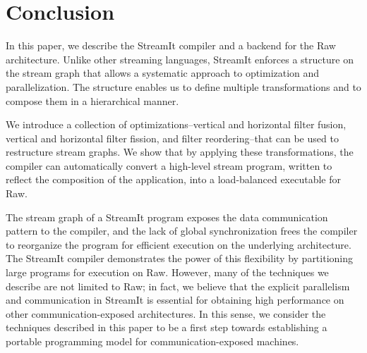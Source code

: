 \section{Conclusion}
\label{sec:conclusion}

In this paper, we describe the StreamIt compiler and a backend for the
Raw architecture.  Unlike other streaming languages, StreamIt enforces
a structure on the stream graph that allows a systematic approach to
optimization and parallelization.  The structure enables us to define
multiple transformations and to compose them in a hierarchical manner.

We introduce a collection of optimizations--vertical and horizontal
filter fusion, vertical and horizontal filter fission, and filter
reordering--that can be used to restructure stream graphs.  We show
that by applying these transformations, the compiler can automatically
convert a high-level stream program, written to reflect the
composition of the application, into a load-balanced executable for
Raw.

The stream graph of a StreamIt program exposes the data communication
pattern to the compiler, and the lack of global synchronization frees
the compiler to reorganize the program for efficient execution on the
underlying architecture. The StreamIt compiler demonstrates the power
of this flexibility by partitioning large programs for execution on
Raw.  However, many of the techniques we describe are not limited to
Raw; in fact, we believe that the explicit parallelism and
communication in StreamIt is essential for obtaining high performance
on other communication-exposed architectures.  In this sense, we
consider the techniques described in this paper to be a first step
towards establishing a portable programming model for
communication-exposed machines.
